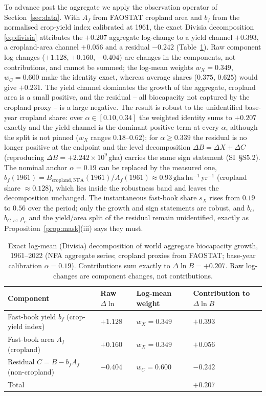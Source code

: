 \documentclass[preprint,12pt,authoryear]{elsarticle}
\begin{document}
To advance past the aggregate we apply the observation operator of Section~\ref{sec:data}. With $A_f$ from FAOSTAT cropland area and $b_f$ from the normalised crop-yield index calibrated at 1961, the exact Divisia decomposition \eqref{eq:divisia} attributes the $+0.207$ aggregate log-change to a yield channel $+0.393$, a cropland-area channel $+0.056$ and a residual $-0.242$ (Table~\ref{tab:divisia}). Raw component log-changes ($+1.128$, $+0.160$, $-0.404$) are changes in the components, not contributions, and cannot be summed; the log-mean weights $w_X=0.349$, $w_C=0.600$ make the identity exact, whereas average shares ($0.375$, $0.625$) would give $+0.231$. The yield channel dominates the growth of the aggregate, cropland area is a small positive, and the residual -- all biocapacity not captured by the cropland proxy -- is a large negative. The result is robust to the unidentified base-year cropland share: over $\alpha\in[0.10,0.34]$ the weighted identity sums to $+0.207$ exactly and the yield channel is the dominant positive term at every $\alpha$, although the split is not pinned ($w_X$ ranges $0.18$--$0.62$); for $\alpha\ge0.339$ the residual is no longer positive at the endpoint and the level decomposition $\Delta B=\Delta X+\Delta C$ (reproducing $\Delta B=+2.242\times10^{9}$\,gha) carries the same sign statement (SI~\S S5.2). The nominal anchor $\alpha=0.19$ can be replaced by the measured one, $b_f(1961)=B_{\mathrm{cropland,NFA}}(1961)/A_f(1961)\approx0.93\,\mathrm{gha\,ha^{-1}\,yr^{-1}}$ (cropland share $\approx0.128$), which lies inside the robustness band and leaves the decomposition unchanged. The instantaneous fast-book share $s_X$ rises from $0.19$ to $0.56$ over the period; only the growth and sign statements are robust, and $b_c$, $b_{G,c}$, $\rho_c$ and the yield/area split of the residual remain unidentified, exactly as Proposition~\ref{prop:mask}(iii) says they must.

\begin{table}[!htbp]
\centering\small
\caption{Exact log-mean (Divisia) decomposition of world aggregate biocapacity growth, 1961--2022 (NFA aggregate series; cropland proxies from FAOSTAT; base-year calibration $\alpha=0.19$). Contributions sum exactly to $\Delta\ln B=+0.207$. Raw log-changes are component changes, not contributions.}
\label{tab:divisia}
\begin{tabularx}{\textwidth}{X l l l}
\toprule
Component & Raw $\Delta\ln$ & Log-mean weight & Contribution to $\Delta\ln B$ \\
\midrule
Fast-book yield $b_f$ (crop-yield index) & $+1.128$ & $w_X=0.349$ & $+0.393$ \\
Fast-book area $A_f$ (cropland) & $+0.160$ & $w_X=0.349$ & $+0.056$ \\
Residual $C=B-b_fA_f$ (non-cropland) & $-0.404$ & $w_C=0.600$ & $-0.242$ \\
\midrule
Total & & & $+0.207$ \\
\bottomrule
\end{tabularx}
\end{table}
\end{document}
